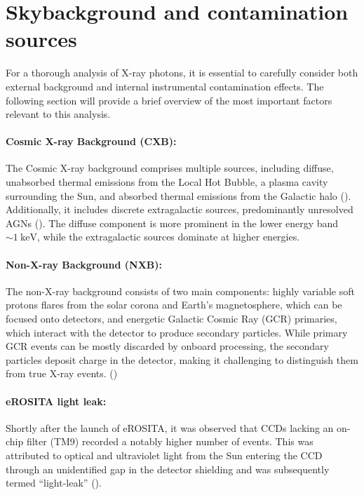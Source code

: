 %
\section{Skybackground and contamination sources}\label{sec:background}
For a thorough analysis of X-ray photons, it is essential to carefully consider both external background and internal instrumental contamination effects. The following section will provide a brief overview of the most important factors relevant to this analysis.
\paragraph*{Cosmic X-ray Background (CXB):} The Cosmic X-ray background comprises multiple sources, including diffuse, unabsorbed thermal emissions from the Local Hot Bubble, a plasma cavity surrounding the Sun, and absorbed thermal emissions from the Galactic halo (\cite{galeazzi2006xmm}). Additionally, it includes discrete extragalactic sources, predominantly unresolved AGNs  (\cite{brandt2005deep}). The diffuse component is more prominent in the lower energy band \(\sim\SI{1}{\kilo\electronvolt}\), while the extragalactic sources dominate at higher energies.
\paragraph*{Non-X-ray Background (NXB):} The non-X-ray background consists of two main components: highly variable soft protons flares from the solar corona and Earth's magnetosphere, which can be focused onto detectors, and energetic Galactic Cosmic Ray (GCR) primaries, which interact with the detector to produce secondary particles. While primary GCR events can be mostly discarded by onboard processing, the secondary particles deposit charge in the detector, making it challenging to distinguish them from true X-ray events. (\cite{Bulbul_2020})
\paragraph*{eROSITA light leak:} Shortly after the launch of eROSITA, it was observed that CCDs lacking an on-chip filter (TM9) recorded a notably higher number of events. This was attributed to optical and ultraviolet light from the Sun entering the CCD through an unidentified gap in the detector shielding and was subsequently termed \enquote{light-leak} (\cite{Predehl2021}). 

